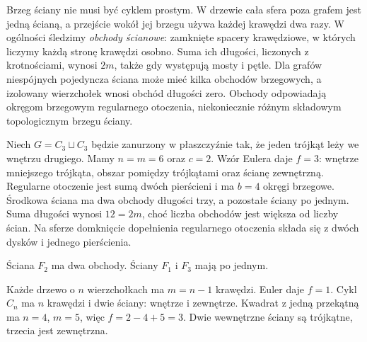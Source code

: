 \begin{uwaga}
Brzeg ściany nie musi być cyklem prostym. W drzewie
cała sfera poza grafem jest jedną ścianą, a przejście
wokół jej brzegu używa każdej krawędzi dwa razy.
W ogólności śledzimy \emph{obchody ścianowe}: zamknięte
spacery krawędziowe, w których liczymy każdą stronę
krawędzi osobno. Suma ich długości, liczonych z krotnościami,
wynosi $2m$, także gdy występują mosty i pętle.
Dla grafów niespójnych pojedyncza ściana może mieć kilka
obchodów brzegowych, a izolowany wierzchołek wnosi
obchód długości zero. Obchody odpowiadają okręgom
brzegowym regularnego otoczenia, niekoniecznie
różnym składowym topologicznym brzegu ściany.
\end{uwaga}

\begin{przyklad}
\label{ex:tg-nested-cycles}
Niech $G=C_3\sqcup C_3$ będzie zanurzony w płaszczyźnie
tak, że jeden trójkąt leży we wnętrzu drugiego.
Mamy $n=m=6$ oraz $c=2$. Wzór Eulera daje $f=3$:
wnętrze mniejszego trójkąta, obszar pomiędzy
trójkątami oraz ścianę zewnętrzną. Regularne otoczenie
jest sumą dwóch pierścieni i ma $b=4$ okręgi brzegowe.
Środkowa ściana ma dwa obchody długości trzy, a pozostałe
ściany po jednym. Suma długości wynosi $12=2m$,
choć liczba obchodów jest większa od liczby ścian.
Na sferze domknięcie dopełnienia regularnego otoczenia
składa się z dwóch dysków i jednego pierścienia.
\end{przyklad}

\begin{center}

{\footnotesize Ściana $F_2$ ma dwa obchody.
Ściany $F_1$ i $F_3$ mają po jednym.}
\end{center}

\begin{przyklad}
Każde drzewo o $n$ wierzchołkach ma $m=n-1$ krawędzi.
Euler daje $f=1$. Cykl $C_n$ ma $n$ krawędzi i dwie ściany:
wnętrze i zewnętrze. Kwadrat z jedną przekątną ma
$n=4$, $m=5$, więc $f=2-4+5=3$.
Dwie wewnętrzne ściany są trójkątne, trzecia jest zewnętrzna.
\end{przyklad}

